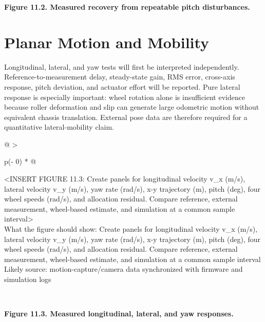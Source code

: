 \begin{center}\singlespacing
{}
\textbf{Figure 11.2. Measured recovery from repeatable pitch disturbances.}
\end{center}

\section{Planar Motion and Mobility}\label{planar-motion-and-mobility}

Longitudinal, lateral, and yaw tests will first be interpreted
independently. Reference-to-measurement delay, steady-state gain, RMS
error, cross-axis response, pitch deviation, and actuator effort will be
reported. Pure lateral response is especially important: wheel rotation
alone is insufficient evidence because roller deformation and slip can
generate large odometric motion without equivalent chassis translation.
External pose data are therefore required for a quantitative
lateral-mobility claim.

\begin{longtable}[]{@{}
  >{\raggedright\arraybackslash}p{(\columnwidth - 0\tabcolsep) * }@{}}
\toprule\noalign{}
\begin{minipage}[b]{\linewidth}\raggedright
\textless INSERT FIGURE 11.3: Create panels for longitudinal velocity
v\_x (m\slash{}s), lateral velocity v\_y (m\slash{}s), yaw rate (rad\slash{}s), x-y
trajectory (m), pitch (deg), four wheel speeds (rad\slash{}s), and allocation
residual. Compare reference, external measurement, wheel-based estimate,
and simulation at a common sample interval\textgreater{}\\
What the figure should show: Create panels for longitudinal velocity
v\_x (m\slash{}s), lateral velocity v\_y (m\slash{}s), yaw rate (rad\slash{}s), x-y
trajectory (m), pitch (deg), four wheel speeds (rad\slash{}s), and allocation
residual. Compare reference, external measurement, wheel-based estimate,
and simulation at a common sample interval\\
Likely source: motion-capture\slash{}camera data synchronized with firmware and
simulation logs\strut
\end{minipage} \\
\midrule\noalign{}
\endhead
\bottomrule\noalign{}
\endlastfoot
\end{longtable}

\begin{center}\singlespacing
{}
\textbf{Figure 11.3. Measured longitudinal, lateral, and yaw responses.}
\end{center}

